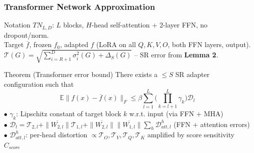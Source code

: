 \documentclass[10pt]{beamer}
\begin{document}
\begin{frame}
    \frametitle{Transformer Network Approximation}
    \vspace{-0.3cm}
    \begin{block}{Notation}
        $TN_{L,D}$: $L$ blocks, $H$-head self-attention + 2-layer FFN, no dropout/norm.\\
        Target $\overline{f}$, frozen $f_0$, adapted $f$ (LoRA on all $Q,K,V,O$, both FFN layers, output).\\
        $\mathcal{T}(G) = \sqrt{\sum_{i=R+1}^{D}\sigma_i^2(G) + \Delta_S(G)}$ -- SR error from \textbf{Lemma 2}.
    \end{block}
    \vspace{-0.2cm}
    \begin{block}{Theorem (Transformer error bound)}
        \vspace{-0.2cm}
        There exists a $\leqslant S$ SR adapter configuration such that
        \vspace{-0.2cm}
        $$\mathbb{E}\|f(x) - \overline{f}(x)\|_F \leqslant \beta\sum_{l=1}^{L}\Big(\prod_{k=l+1}^L \gamma_k\Big)\mathcal{D}_l$$
        $\bullet$ $\gamma_k$: Lipschitz constant of target block $k$ w.r.t. input (via FFN + MHA)\\
        $\bullet$ $\mathcal{D}_l = \mathcal{T}_{2,l} + \|\overline{W_{2,l}}\|\mathcal{T}_{1,l} + \|\overline{W_{2,l}}\|\|\overline{W_{1,l}}\|\sum_h \mathcal{D}_{att,l}^h$ (FFN + attention errors)\\
        $\bullet$ $\mathcal{D}_{att,l}^h$: per-head distortion $\propto \mathcal{T}_{O},\mathcal{T}_{V},\mathcal{T}_{Q},\mathcal{T}_{K}$ amplified by score sensitivity $C_{score}$
    \end{block}
\end{frame}
\end{document}
